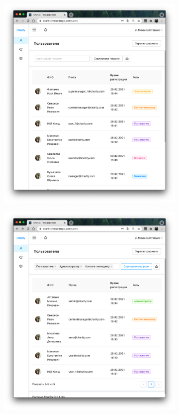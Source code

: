 \documentclass[a4paper,12pt,reqno]{article}
\begin{document}
	\begin{figure}[H]
		\centering
		\begin{subfigure}[b]{0.475\linewidth}
			\includegraphics[width=\linewidth]{img/ro/users.png}
		\end{subfigure}
		\begin{subfigure}[b]{0.475\linewidth}
			\includegraphics[width=\linewidth]{img/ro/users_filtered.png}

\end{subfigure}
\end{figure}
\end{document}
